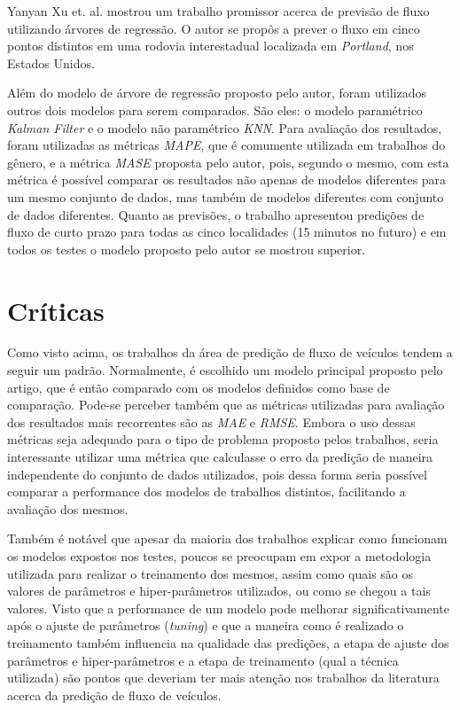 Yanyan Xu et. al. \cite{xu2013short} mostrou um trabalho promissor acerca de previsão de fluxo utilizando árvores de regressão. O autor se propôs a prever o fluxo em cinco pontos distintos em uma rodovia interestadual localizada em \textit{Portland}, nos Estados Unidos.

Além do modelo de árvore de regressão proposto pelo autor, foram utilizados outros dois modelos para serem comparados. São eles: o modelo paramétrico \textit{Kalman Filter} e o modelo não paramétrico \textit{\acrfull{KNN}}. Para avaliação dos resultados, foram utilizadas as métricas \textit{\acrshort{MAPE}}, que é comumente utilizada em trabalhos do gênero, e a métrica \textit{\acrfull{MASE}} proposta pelo autor, pois, segundo o mesmo, com esta métrica é possível comparar os resultados não apenas de modelos diferentes para um mesmo conjunto de dados, mas também de modelos diferentes com conjunto de dados diferentes. 
Quanto as previsões, o trabalho apresentou predições de fluxo de curto prazo para todas as cinco localidades (15 minutos no futuro) e em todos os testes o modelo proposto pelo autor se mostrou superior. %

\section{Críticas}

Como visto acima, os trabalhos da área de predição de fluxo de veículos tendem a seguir um padrão. Normalmente, é escolhido um modelo principal proposto pelo artigo, que é então comparado com os modelos definidos como base de comparação. Pode-se perceber também que as métricas utilizadas para avaliação dos resultados mais recorrentes são as \textit{\acrshort{MAE}} e \textit{\acrshort{RMSE}}. Embora o uso dessas métricas seja adequado para o tipo de problema proposto pelos trabalhos, seria interessante utilizar uma métrica que calculasse o erro da predição de maneira independente do conjunto de dados utilizados, pois dessa forma seria possível comparar a performance dos modelos de trabalhos distintos, facilitando a avaliação dos mesmos.

Também é notável que apesar da maioria dos trabalhos explicar como funcionam os modelos expostos nos testes, poucos se preocupam em expor a metodologia utilizada para realizar o treinamento dos mesmos, assim como quais são os valores de parâmetros e hiper-parâmetros utilizados, ou como se chegou a tais valores. Visto que a performance de um modelo pode melhorar significativamente após o ajuste de parâmetros (\textit{tuning}) e que a maneira como é realizado o treinamento também influencia na qualidade das predições, a etapa de ajuste dos parâmetros e hiper-parâmetros e a etapa de treinamento (qual a técnica utilizada) são pontos que deveriam ter mais atenção nos trabalhos da literatura acerca da predição de fluxo de veículos.